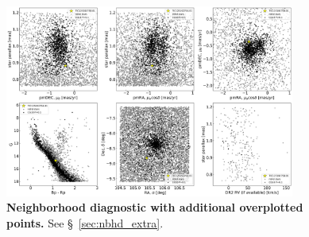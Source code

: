 \documentclass[12pt,twocolumn,tighten]{aastex62}
\begin{document}
\begin{figure}[!h]
	\begin{center}
		\leavevmode
		\includegraphics[width=0.85\textwidth]{TIC125192758O-lb20190918_NGC_2323_neighborhood_extra.png}
	\end{center}
	\vspace{-0.5cm}
	\caption{
		{\bf Neighborhood diagnostic with additional overplotted points.} See \S~\ref{sec:nbhd_extra}.
		\label{fig:nbhd_extra}
	}
\end{figure}


\clearpage
\newpage
                            
 
\end{document}

